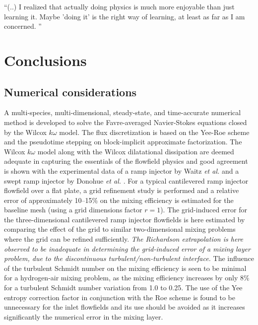 \begin{chapterquote}
   ``(..) I realized that actually doing physics is much more enjoyable than just
   learning it. Maybe 'doing it' is the right way of learning, at least as far as
   I am concerned. ''
\end{chapterquote}

\chapter{Conclusions}

\section{Numerical considerations}

A multi-species, multi-dimensional, steady-state, and time-accurate numerical method
is developed to solve the Favre-averaged Navier-Stokes equations closed by the
Wilcox $k\omega$ model. The flux discretization is based on the Yee-Roe scheme
and the pseudotime stepping on block-implicit approximate factorization.
The Wilcox $k\omega$ model along with the Wilcox dilatational dissipation
are deemed adequate in capturing the essentials of the
flowfield physics and good agreement is shown with the
experimental data of a ramp injector by Waitz {\it et al.} \cite{aiaa:1993:waitz}
and a swept ramp injector by Donohue {\it et al.} \cite{aiaa:1994:donohue}.
For a typical cantilevered ramp
injector flowfield over a flat plate, a grid refinement study is performed
and a relative error of approximately 10--15\% on the mixing efficiency is estimated
for the baseline mesh (using a grid dimensions factor $r=1$). The grid-induced
error for the three-dimensional cantilevered ramp injector flowfields is here estimated
by comparing the effect of the grid to similar two-dimensional
mixing problems where the grid can be refined sufficiently. \emph{The Richardson extrapolation
is here observed to be inadequate in determining the grid-induced error of
a mixing layer problem, due to the discontinuous turbulent/non-turbulent interface.}
The influence of the turbulent Schmidt number on the mixing
efficiency is seen to be minimal for a hydrogen-air mixing problem, as the mixing
efficiency increases by only 8\% for a turbulent Schmidt number variation from 1.0 to 0.25.
The use of the Yee entropy correction factor in conjunction with the Roe scheme
is found to be unnecessary for the inlet flowfields and its use
should be avoided as it increases significantly the numerical error in the mixing layer.


